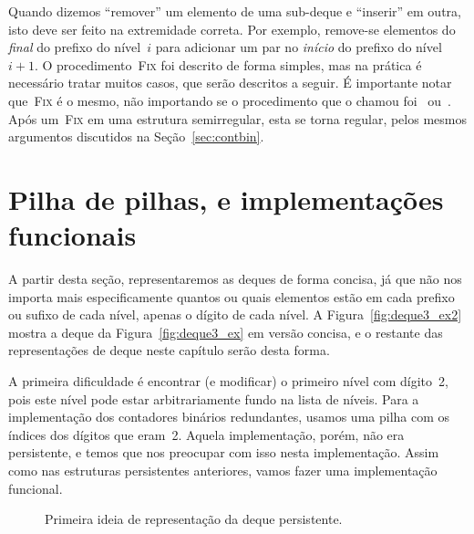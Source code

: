 \documentclass[main.tex]{subfiles}
\begin{document}
Quando dizemos ``remover'' um elemento de uma sub-deque e ``inserir'' em outra, isto deve ser feito na extremidade correta. Por exemplo, remove-se elementos do \emph{final} do prefixo do nível~$i$ para adicionar um par no \emph{início} do prefixo do nível~$i+1$. O procedimento~\textsc{Fix} foi descrito de forma simples, mas na prática é necessário tratar muitos casos, que serão descritos a seguir. É importante notar que~\textsc{Fix} é o mesmo, não importando se o procedimento que o chamou foi~ ou~. Após um~\textsc{Fix} em uma estrutura semirregular, esta se torna regular, pelos mesmos argumentos discutidos na Seção~\ref{sec:contbin}.

\section{Pilha de pilhas, e implementações funcionais} \label{sec:implfunc}

A partir desta seção, representaremos as deques de forma concisa, já que não nos importa mais especificamente quantos ou quais elementos estão em cada prefixo ou sufixo de cada nível, apenas o dígito de cada nível. A Figura~\ref{fig:deque3_ex2} mostra a deque da Figura~\ref{fig:deque3_ex} em versão concisa, e o restante das representações de deque neste capítulo serão desta forma.

A primeira dificuldade é encontrar (e modificar) o primeiro nível com dígito~2, pois este nível pode estar arbitrariamente fundo na lista de níveis. Para a implementação dos contadores binários redundantes, usamos uma pilha com os índices dos dígitos que eram~2. Aquela implementação, porém, não era persistente, e temos que nos preocupar com isso nesta implementação. Assim como nas estruturas persistentes anteriores, vamos fazer uma implementação funcional.


\begin{figure}
\centering
{}
\caption{Primeira ideia de representação da deque persistente.} \label{fig:func_ex1}
\end{figure}
\end{document}
